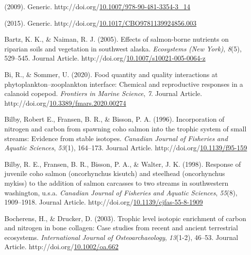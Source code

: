 \documentclass [11pt, proquest] {uwthesis}[2015/03/03]
\newlength{\cslhangindent}
\newenvironment{CSLReferences}%
{\setlength{\parindent}{0pt}%
\everypar{\setlength{\hangindent}{\cslhangindent}}\ignorespaces}%
{\par}
\begin{document}
\hypertarget{refs}{}
\begin{CSLReferences}{1}{0}
\leavevmode\hypertarget{ref-Graham2010}{}%
(2009). Generic. http://doi.org/\href{https://doi.org/10.1007/978-90-481-3354-3_14}{10.1007/978-90-481-3354-3\_14}

\leavevmode\hypertarget{ref-Frank2015}{}%
(2015). Generic. http://doi.org/\href{https://doi.org/10.1017/CBO9781139924856.003}{10.1017/CBO9781139924856.003}

\leavevmode\hypertarget{ref-Bartz2005}{}%
Bartz, K. K., \& Naiman, R. J. (2005). Effects of salmon-borne nutrients on riparian soils and vegetation in southwest alaska. \emph{Ecosystems (New York)}, \emph{8}(5), 529--545. Journal Article. http://doi.org/\href{https://doi.org/10.1007/s10021-005-0064-z}{10.1007/s10021-005-0064-z}

\leavevmode\hypertarget{ref-Bi2020}{}%
Bi, R., \& Sommer, U. (2020). Food quantity and quality interactions at phytoplankton--zooplankton interface: Chemical and reproductive responses in a calanoid copepod. \emph{Frontiers in Marine Science}, \emph{7}. Journal Article. http://doi.org/\href{https://doi.org/10.3389/fmars.2020.00274}{10.3389/fmars.2020.00274}

\leavevmode\hypertarget{ref-Bilby1996}{}%
Bilby, Robert E., Fransen, B. R., \& Bisson, P. A. (1996). Incorporation of nitrogen and carbon from spawning coho salmon into the trophic system of small streams: Evidence from stable isotopes. \emph{Canadian Journal of Fisheries and Aquatic Sciences}, \emph{53}(1), 164--173. Journal Article. http://doi.org/\href{https://doi.org/10.1139/f95-159}{10.1139/f95-159}

\leavevmode\hypertarget{ref-Bilby1998}{}%
Bilby, R. E., Fransen, B. R., Bisson, P. A., \& Walter, J. K. (1998). Response of juvenile coho salmon (oncorhynchus kisutch) and steelhead (oncorhynchus mykiss) to the addition of salmon carcasses to two streams in southwestern washington, u.s.a. \emph{Canadian Journal of Fisheries and Aquatic Sciences}, \emph{55}(8), 1909--1918. Journal Article. http://doi.org/\href{https://doi.org/10.1139/cjfas-55-8-1909}{10.1139/cjfas-55-8-1909}

\leavevmode\hypertarget{ref-Bocherens2003}{}%
Bocherens, H., \& Drucker, D. (2003). Trophic level isotopic enrichment of carbon and nitrogen in bone collagen: Case studies from recent and ancient terrestrial ecosystems. \emph{International Journal of Osteoarchaeology}, \emph{13}(1-2), 46--53. Journal Article. http://doi.org/\href{https://doi.org/10.1002/oa.662}{10.1002/oa.662}


\end{CSLReferences}
\end{document}
